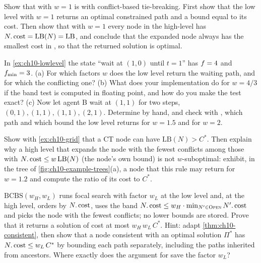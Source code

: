 \begin{exercise}[\difficulty{2}]
\label{exr:ch10-w-one}
Show that \ecbs with $w = 1$ is \cbs with conflict-based tie-breaking. First
show that the low level with $w = 1$ returns an optimal constrained path and
a bound equal to its cost. Then show that with $w = 1$ every node in the
high-level \Focal has $N.\operatorname{cost} = \mathrm{LB}(N) = \mathrm{LB}$, and conclude
that the expanded node always has the smallest cost in \Open, so that the
returned solution is optimal.
\end{exercise}

\begin{exercise}[\difficulty{2}]
\label{exr:ch10-lowlevel-threshold}
In \cref{ex:ch10-lowlevel} the state ``wait at $(1,0)$ until $t = 1$'' has
$f = 4$ and $f_{\min} = 3$. (a) For which factors $w$ does the low
level return the waiting path, and for which the conflicting one? (b) What
does your implementation do for $w = 4/3$ if the band test is computed in
floating point, and how do you make the test exact? (c) Now let agent B wait
at $(1,1)$ for two steps, $(0,1), (1,1), (1,1), (2,1)$. Determine by hand,
and check with , which path and which bound
the low level returns for $w = 1.5$ and for $w = 2$.
\end{exercise}

\begin{exercise}[\difficulty{2}]
\label{exr:ch10-node-bound}
Show with \cref{ex:ch10-grid} that a CT node can have
$\mathrm{LB}(N) > C^*$. Then explain why a high level that expands the node
with the fewest conflicts among those with $N.\operatorname{cost} \le w\,\mathrm{LB}(N)$
(the node's own bound) is not $w$-suboptimal: exhibit, in the tree of
\cref{fig:ch10-example-trees}(a), a node that this rule may return for
$w = 1.2$ and compute the ratio of its cost to $C^*$.
\end{exercise}

\begin{exercise}[\difficulty{3}]
\label{exr:ch10-bcbs-proof}
$\mathrm{BCBS}(w_H, w_L)$ runs focal search with factor $w_L$ at the low
level and, at the high level, orders \Open by $N.\operatorname{cost}$, uses the band
$N.\operatorname{cost} \le w_H \cdot \min_{N' \in \textsc{Open}} N'.\operatorname{cost}$ and picks the node with
the fewest conflicts; no lower bounds are stored. Prove that it returns a
solution of cost at most $w_H\,w_L\,C^*$. Hint: adapt
\cref{thm:ch10-consistent}, then show that a node consistent with an optimal
solution $\Pi^*$ has $N.\operatorname{cost} \le w_L\,C^*$ by bounding each path
separately, including the paths inherited from ancestors. Where exactly does
the argument for \ecbs save the factor $w_L$?
\end{exercise}

